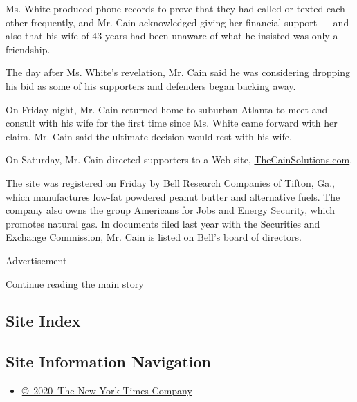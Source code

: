 Ms. White produced phone records to prove that they had called or texted
each other frequently, and Mr. Cain acknowledged giving her financial
support --- and also that his wife of 43 years had been unaware of what
he insisted was only a friendship.

The day after Ms. White's revelation, Mr. Cain said he was considering
dropping his bid as some of his supporters and defenders began backing
away.

On Friday night, Mr. Cain returned home to suburban Atlanta to meet and
consult with his wife for the first time since Ms. White came forward
with her claim. Mr. Cain said the ultimate decision would rest with his
wife.

On Saturday, Mr. Cain directed supporters to a Web site,
\href{http://thecainsolutions.com/}{TheCainSolutions.com}.

The site was registered on Friday by Bell Research Companies of Tifton,
Ga., which manufactures low-fat powdered peanut butter and alternative
fuels. The company also owns the group Americans for Jobs and Energy
Security, which promotes natural gas. In documents filed last year with
the Securities and Exchange Commission, Mr. Cain is listed on Bell's
board of directors.

Advertisement

\protect\hyperlink{after-bottom}{Continue reading the main story}

\hypertarget{site-index}{%
\subsection{Site Index}\label{site-index}}

\hypertarget{site-information-navigation}{%
\subsection{Site Information
Navigation}\label{site-information-navigation}}

\begin{itemize}
\tightlist
\item
  \href{https://help.nytimes.com/hc/en-us/articles/115014792127-Copyright-notice}{©~2020~The
  New York Times Company}
\end{itemize}

